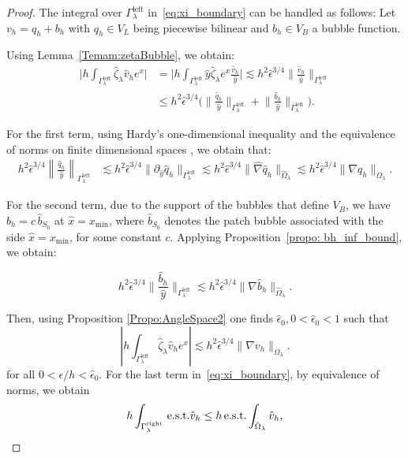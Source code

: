 \documentclass[10pt,a4paper]{amsart}
\newcommand{\Gammaleft}{\ensuremath{\Gamma_\lambda^{\text{left}}}\xspace}
\newcommand{\Gammaright}{\ensuremath{\Gamma_\lambda^{\text{right}}}\xspace}
\newcommand{\est}{\text{\,e.s.t.}\xspace}
\begin{document}
\begin{proof}
The integral over \Gammaleft in~\eqref{eq:xi_boundary}   can be handled as follows:
Let ${v_h = q_h + b_h}$ with $q_h \in V_L$ being piecewise bilinear and $b_h \in V_B$  a bubble function.

Using Lemma~\ref{Temam:zetaBubble}, we obtain:
\begin{equation*}
\begin{aligned}
\Big|h\int_{\Gammaleft} \hat{\zeta}_\lambda \hat{v}_h e^x\Big| &= 
    \Big| h\int_{\Gammaleft} \hat{y} \hat{\zeta}_\lambda e^x \frac{\hat{v}_h}{\hat{y}} \Big|
  \lesssim h^2\hat{\epsilon}^{3/4} \bigg\| \frac{\hat{v}_h}{\hat{y}}\bigg\|_{\Gammaleft} 
  \\
  & \le h^2\hat{\epsilon}^{3/4} \Big(\bigg\| \frac{\hat{q}_h}{\hat{y}}\bigg\|_{\Gammaleft}+ \bigg\| \frac{\hat{b}_h}{\hat{y}}\bigg\|_{\Gammaleft}\Big).
\end{aligned}
\end{equation*}

For the first term, using Hardy's one-dimensional inequality and the equivalence of norms on finite dimensional spaces%
, we obtain that:
\begin{equation*}
 \begin{aligned}
  h^2\hat{\epsilon}^{3/4} \left\| \frac{\hat{q}_h}{\hat{y}}\right\|_{\Gammaleft}
 &\lesssim  h^2\hat{\epsilon}^{3/4} \| \partial_{\hat{y}} \hat{q}_h\|_{\Gammaleft} 
 \lesssim h^2\hat{\epsilon}^{3/4} \| \hat{\nabla} \hat{q}_h\|_{\hat{\Omega}_\lambda}
 \lesssim  h^2\hat{\epsilon}^{3/4} \| \nabla q_h\|_{\Omega_\lambda}.
 \end{aligned}   
\end{equation*}

For the second term, due to the support of the bubbles that define $V_B$, we have $\hat{b}_h = c \, \hat{b}_{S_0}$ at $\hat{x} = x_{\min}$, where $\hat{b}_{S_0}$ denotes the patch bubble associated with the side $\hat{x} = x_{\min}$, for some constant $c$. Applying Proposition~\ref{propo: bh_inf_bound}, we obtain:

\begin{equation*}
      h^2\hat{\epsilon}^{3/4} \bigg\| \frac{\hat{b}_h}{\hat{y}}\bigg\|_{\Gammaleft}
      \lesssim 
      h^2\hat{\epsilon}^{3/4} \| \nabla  \hat{b}_h\|_{\hat{\Omega}_\lambda}.
\end{equation*}

Then, using Proposition \ref{Propo:AngleSpace2} 
one finds $\hat{\epsilon}_0, 0 < \hat{\epsilon}_0 < 1$ such that
\begin{equation}\label{Eq:78}
    |h\int_{\Gammaleft} \hat{\zeta}_\lambda \hat{v}_h e^x| \lesssim
     h^2\hat{\epsilon}^{3/4} \| \nabla v_h\|_{\Omega_\lambda}.
\end{equation}
for all $0<\epsilon/h < \hat{\epsilon}_0$.
For the last term in~\eqref{eq:xi_boundary}, by equivalence of norms, we obtain
\begin{equation}
\label{Eq:80}
    h\int_{\Gammaright} \text{\est } \hat{v}_h
    \leq
    h\est \int_{\hat{\Omega}_{\lambda}}\hat{v}_h,
\end{equation}


\end{proof}
\end{document}
